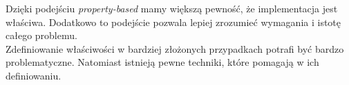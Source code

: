 Dzięki podejściu \textit{property-based} mamy większą pewność, że implementacja jest właściwa. Dodatkowo to podejście pozwala lepiej zrozumieć wymagania i istotę całego problemu.\\
Zdefiniowanie właściwości w bardziej złożonych przypadkach potrafi być bardzo problematyczne. Natomiast istnieją pewne techniki, które pomagają w ich definiowaniu.